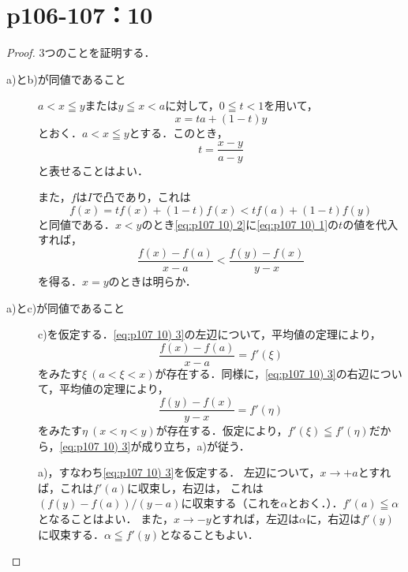 \documentclass[a4paper,10pt,fleqn]{ltjsarticle}
\begin{document}
\section*{p106-107：10}



\begin{tleftbar}
    \begin{proof}
        3つのことを証明する．
        \begin{description}
            \item[a)とb)が同値であること] \mbox{} \par 
            $a < x \leqq y$または$y \leqq x <a$に対して，$0 \leqq t < 1$を用いて，
            \[
                x=ta+(1-t)y
            \]
            とおく．$a < x \leqq y$とする．このとき，
            \begin{equation}
                \label{eq:p107 10) 1}
            t = \frac{x-y}{a-y}
            \end{equation}
            と表せることはよい．

            また，$f$は$I$で凸であり，これは
            \begin{equation}
                \label{eq:p107 10) 2}
                f(x)=tf(x)+(1-t)f(x) < tf(a)+(1-t)f(y)
            \end{equation}
            と同値である．$x<y$のとき\eqref{eq:p107 10) 2}に\eqref{eq:p107 10) 1}の$t$の値を代入すれば，
            \begin{equation}
                \label{eq:p107 10) 3}
                \frac{f(x)-f(a)}{x-a} < \frac{f(y)-f(x)}{y-x}
            \end{equation}
            を得る．$x=y$のときは明らか．
            \item [a)とc)が同値であること] \mbox{} \par
            c)を仮定する．\eqref{eq:p107 10) 3}の左辺について，平均値の定理により，
            \[
                \frac{f(x)-f(a)}{x-a}=f'(\xi)
            \]
            をみたす$\xi ~(a<\xi <x)$が存在する．同様に，\eqref{eq:p107 10) 3}の右辺について，平均値の定理により，
            \[
                \frac{f(y)-f(x)}{y-x}=f'(\eta)
            \]
            をみたす$\eta~ (x<\eta < y)$が存在する．仮定により，$f'(\xi)\leqq f'(\eta)$だから，\eqref{eq:p107 10) 3}が成り立ち，a)が従う．

            a)，すなわち\eqref{eq:p107 10) 3}を仮定する．
            左辺について，$x \to + a$とすれば，これは$f'(a)$に収束し，右辺は，
            これは$(f(y)-f(a))/(y-a)$に収束する（これを$\alpha$とおく．）．$f'(a) \leqq \alpha$となることはよい．
            また，$x \to - y$とすれば，左辺は$\alpha$に，右辺は$f'(y)$に収束する．$\alpha \leqq f'(y)$となることもよい．


\end{description}
\end{proof}
\end{tleftbar}
\end{document}
